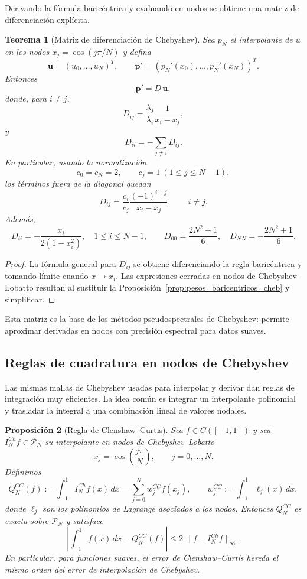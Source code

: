 \documentclass[a4paper,11pt]{report}
\newtheorem{theorem}{Teorema}[chapter]
\newtheorem{proposition}[theorem]{Proposición}
\begin{document}
Derivando la fórmula baricéntrica y evaluando en nodos se obtiene una matriz de diferenciación explícita.

\begin{theorem}[Matriz de diferenciación de Chebyshev]\label{thm:matriz_diferenciacion_cheb}
Sea $p_N$ el interpolante de $u$ en los nodos $x_j=\cos(j\pi/N)$ y defina
\[
\mathbf u=(u_0,\dots,u_N)^T,\qquad
\mathbf p'=(p_N'(x_0),\dots,p_N'(x_N))^T.
\]
Entonces
\[
\mathbf p'=D\,\mathbf u,
\]
donde, para $i\ne j$,
\[
D_{ij}=\frac{\lambda_j}{\lambda_i}\frac{1}{x_i-x_j},
\]
y
\[
D_{ii}=-\sum_{j\ne i}D_{ij}.
\]
En particular, usando la normalización
\[
c_0=c_N=2,\qquad c_j=1\ (1\le j\le N-1),
\]
los términos fuera de la diagonal quedan
\[
D_{ij}=\frac{c_i}{c_j}\frac{(-1)^{i+j}}{x_i-x_j},\qquad i\ne j.
\]
Además,
\[
D_{ii}=-\frac{x_i}{2(1-x_i^2)},\quad 1\le i\le N-1,
\qquad
D_{00}=\frac{2N^2+1}{6},\quad D_{NN}=-\frac{2N^2+1}{6}.
\]
\end{theorem}

\begin{proof}
La fórmula general para $D_{ij}$ se obtiene diferenciando la regla baricéntrica y tomando límite cuando $x\to x_i$. Las expresiones cerradas en nodos de Chebyshev--Lobatto resultan al sustituir la Proposición~\ref{prop:pesos_baricentricos_cheb} y simplificar.
\end{proof}

Esta matriz es la base de los métodos pseudospectrales de Chebyshev: permite aproximar derivadas en nodos con precisión espectral para datos suaves.

\subsection{Reglas de cuadratura en nodos de Chebyshev}

Las mismas mallas de Chebyshev usadas para interpolar y derivar dan reglas de integración muy eficientes. La idea común es integrar un interpolante polinomial y trasladar la integral a una combinación lineal de valores nodales.

\begin{proposition}[Regla de Clenshaw--Curtis]\label{prop:clenshaw_curtis}
Sea $f\in C([-1,1])$ y sea $I_N^{Ch}f\in\mathcal P_N$ su interpolante en nodos de Chebyshev--Lobatto
\[
x_j=\cos\!\left(\frac{j\pi}{N}\right),\qquad j=0,\dots,N.
\]
Definimos
\[
Q_N^{CC}(f):=\int_{-1}^1 I_N^{Ch}f(x)\,dx=\sum_{j=0}^N w_j^{CC}f(x_j),
\qquad
w_j^{CC}:=\int_{-1}^1\ell_j(x)\,dx,
\]
donde $\ell_j$ son los polinomios de Lagrange asociados a los nodos. Entonces $Q_N^{CC}$ es exacta sobre $\mathcal P_N$ y satisface
\[
\left|\int_{-1}^1 f(x)\,dx-Q_N^{CC}(f)\right|\le 2\,\|f-I_N^{Ch}f\|_\infty.
\]
En particular, para funciones suaves, el error de Clenshaw--Curtis hereda el mismo orden del error de interpolación de Chebyshev.
\end{proposition}
\end{document}

